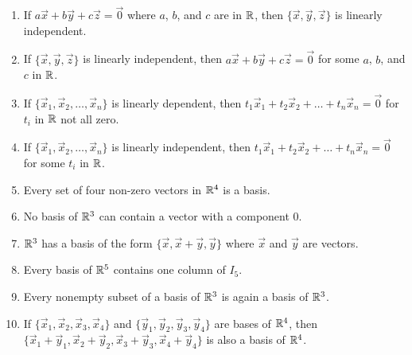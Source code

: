 \documentclass{ximera}
\begin{document}
\begin{problem}
\begin{enumerate}
\item If $a\vec{x} + b\vec{y} + c\vec{z} = \vec{0}$ where $a$, $b$, and $c$ are in $\mathbb{R}$, then $\{\vec{x}, \vec{y}, \vec{z}\}$ is linearly independent.

\item If $\{\vec{x}, \vec{y}, \vec{z}\}$ is linearly independent, then $a\vec{x} + b\vec{y} + c\vec{z} = \vec{0}$ for some $a$, $b$, and $c$ in $\mathbb{R}$.

\item If $\{\vec{x}_{1}, \vec{x}_{2}, \dots, \vec{x}_{n}\}$ is linearly dependent, then \newline $t_{1}\vec{x}_{1} + t_{2}\vec{x}_{2} + \dots + t_{n}\vec{x}_{n} = \vec{0}$ for $t_{i}$ in $\mathbb{R}$ not all zero.

\item If $\{\vec{x}_{1}, \vec{x}_{2}, \dots, \vec{x}_{n}\}$ is linearly independent, then \newline $t_{1}\vec{x}_{1} + t_{2}\vec{x}_{2} + \dots + t_{n}\vec{x}_{n} = \vec{0}$ for some $t_{i}$ in $\mathbb{R}$.

\item Every set of four non-zero vectors in $\mathbb{R}^4$ is a basis.

\item No basis of $\mathbb{R}^3$ can contain a vector with a component $0$.

\item $\mathbb{R}^3$ has a basis of the form $\{\vec{x}, \vec{x} + \vec{y}, \vec{y}\}$ where $\vec{x}$ and $\vec{y}$ are vectors.

\item Every basis of $\mathbb{R}^5$ contains one column of $I_{5}$.

\item Every nonempty subset of a basis of $\mathbb{R}^3$ is again a basis of $\mathbb{R}^3$.

\item If $\{\vec{x}_{1}, \vec{x}_{2}, \vec{x}_{3}, \vec{x}_{4}\}$ and $\{\vec{y}_{1}, \vec{y}_{2}, \vec{y}_{3}, \vec{y}_{4}\}$ are bases of $\mathbb{R}^4$, then $\{\vec{x}_{1} + \vec{y}_{1}, \vec{x}_{2} + \vec{y}_{2}, \vec{x}_{3} + \vec{y}_{3}, \vec{x}_{4} + \vec{y}_{4}\}$ is also a basis of $\mathbb{R}^4$.

\end{enumerate}
\end{problem}
\end{document}

